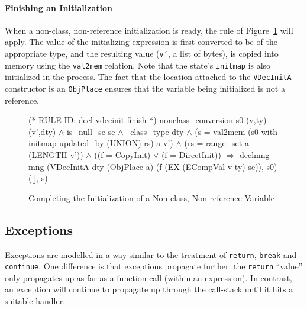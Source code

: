 \documentclass[11pt]{article}
\begin{document}
\paragraph{Finishing an Initialization}
When a non-class, non-reference initialization is ready, the rule
 of Figure~\ref{fig:decl-vdecinit-finish}
will apply.  The value of the initializing expression is first
converted to be of the appropriate type, and the resulting value
(\texttt{v'}, a list of bytes), is copied into memory using the
\texttt{val2mem} relation.  Note that
the state's \texttt{initmap} is also initialized in the
process.  The fact that the location attached to the
\texttt{VDecInitA} constructor is an \texttt{ObjPlace} ensures that
the variable being initialized is not a reference.%
%
\begin{figure}
%
%
\begin{stdrule}
(* RULE-ID: decl-vdecinit-finish *)
     nonclass_conversion s0 (v,ty) (v',dty) \(\land\)
     is_null_se se \(\land\)
     ~class_type dty \(\land\)
     (s = val2mem (s0 with initmap updated_by (UNION) rs) a v') \(\land\)
     (rs = range_set a (LENGTH v')) \(\land\)
     ((f = CopyInit) \(\lor\) (f = DirectInit))
   \(\Rightarrow\)
     declmng mng (VDecInitA dty
                            (ObjPlace a)
                            (f (EX (ECompVal v ty) se)), s0)
                 ([], s)
\end{stdrule}
\caption[Finishing Initialization of a Non-class, Non-reference
  Variable]{Completing the Initialization of a Non-class, Non-reference
  Variable}
\label{fig:decl-vdecinit-finish}
\end{figure}

\subsection{Exceptions}
\label{sec:exceptions}
\newcommand{\ethrow}{\texttt{EThrow}}

Exceptions are modelled in a way similar to the treatment of
\texttt{return}, \texttt{break} and \texttt{continue}.  One difference
is that exceptions propagate further: the \texttt{return} ``value''
only propagates up as far as a function call (within an expression).
In contrast, an exception will continue to propagate up through the
call-stack until it hits a suitable handler.
\end{document}
